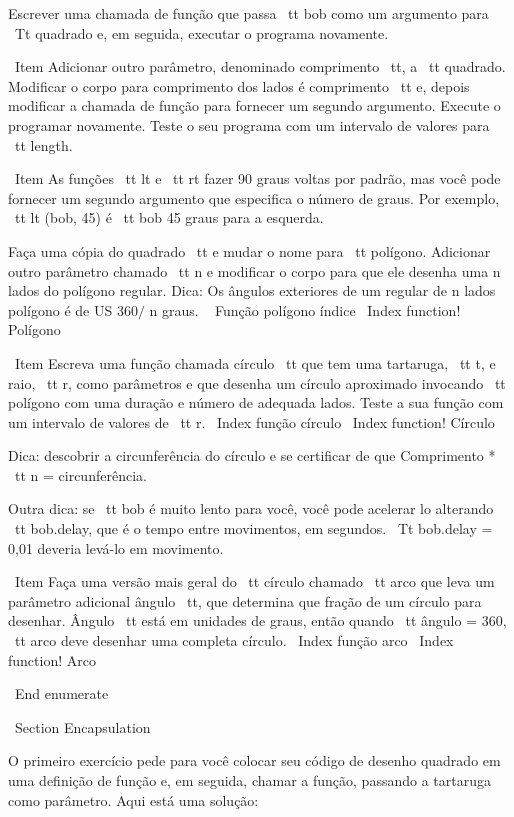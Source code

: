 \documentclass[10pt]{book}
\begin{document}
{Escrever uma chamada de função que passa {\ tt bob} como um argumento para
{\ Tt quadrado} e, em seguida, executar o programa novamente.

\ Item Adicionar outro parâmetro, denominado {comprimento \ tt}, a {\ tt quadrado}.
Modificar o corpo para comprimento dos lados é {comprimento \ tt} e, depois
modificar a chamada de função para fornecer um segundo argumento. Execute o
programar novamente. Teste o seu programa com um intervalo de valores para {\ tt
length}.

\ Item As funções {\ tt lt} e {\ tt rt} fazer 90 graus voltas por
padrão, mas você pode fornecer um segundo argumento que especifica o
número de graus. Por exemplo, {\ tt lt (bob, 45)} é {\ tt bob} 45
graus para a esquerda.

Faça uma cópia do quadrado {\ tt} e mudar o nome para {\ tt polígono}. Adicionar
outro parâmetro chamado {\ tt n} e modificar o corpo para que ele desenha uma
n lados do polígono regular. Dica: Os ângulos exteriores de um regular de n lados
polígono é de US $ 360 / $ n graus.
\ {} Função polígono índice
\ Index {function! Polígono}

\ Item Escreva uma função chamada {círculo \ tt} que tem uma tartaruga, {\ tt t},
e raio, {\ tt r}, como parâmetros e que desenha um círculo aproximado
invocando {\ tt polígono} com uma duração e número de adequada
lados. Teste a sua função com um intervalo de valores de {\ tt r}.
\ Index {função círculo}
\ Index {function! Círculo}

Dica: descobrir a circunferência do círculo e se certificar de que
{Comprimento * \ tt n = circunferência}.

Outra dica: se {\ tt bob} é muito lento para você, você pode acelerar
lo alterando {\ tt bob.delay}, que é o tempo entre movimentos,
em segundos. {\ Tt bob.delay = 0,01} deveria levá-lo em movimento.


\ Item Faça uma versão mais geral do {\ tt círculo} chamado {\ tt arco}
que leva um parâmetro adicional {ângulo \ tt}, que determina
que fração de um círculo para desenhar. {Ângulo \ tt} está em unidades de
graus, então quando {\ tt ângulo = 360}, {\ tt arco} deve desenhar uma completa
círculo.
\ Index {função arco}
\ Index {function! Arco}

\ End {enumerate}

\ Section {} Encapsulation

O primeiro exercício pede para você colocar seu código de desenho quadrado
em uma definição de função e, em seguida, chamar a função, passando
a tartaruga como parâmetro. Aqui está uma solução:

}
\end{document}
